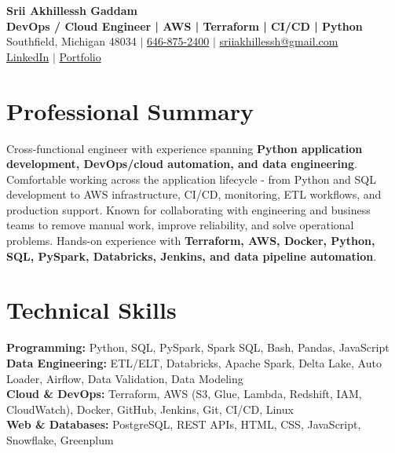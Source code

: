\documentclass[letterpaper,10pt]{article}
\begin{document}
\fontsize{9.35pt}{10.45pt}\selectfont

\begin{center}
    {\LARGE \textbf{Srii Akhillessh Gaddam}} \\[-1pt]
    \textbf{DevOps / Cloud Engineer | AWS | Terraform | CI/CD | Python} \\[2pt]
    Southfield, Michigan 48034 $|$
    \href{tel:6468752400}{646-875-2400} $|$
    \href{mailto:sriiakhillessh@gmail.com}{sriiakhillessh@gmail.com} \\[1pt]
    \href{https://www.linkedin.com/in/srii-akhiilessh-gaddam-b48668191/}{LinkedIn} $|$
    \href{https://sriiakhillesshg.github.io/portfolio/}{Portfolio}
\end{center}
\vspace{-8pt}

\section{Professional Summary}
\small{Cross-functional engineer with experience spanning \textbf{Python application development, DevOps/cloud automation, and data engineering}. Comfortable working across the application lifecycle - from Python and SQL development to AWS infrastructure, CI/CD, monitoring, ETL workflows, and production support. Known for collaborating with engineering and business teams to remove manual work, improve reliability, and solve operational problems. Hands-on experience with \textbf{Terraform, AWS, Docker, Python, SQL, PySpark, Databricks, Jenkins, and data pipeline automation}.}

\section{Technical Skills}
\small{
\textbf{Programming:} Python, SQL, PySpark, Spark SQL, Bash, Pandas, JavaScript \\
\textbf{Data Engineering:} ETL/ELT, Databricks, Apache Spark, Delta Lake, Auto Loader, Airflow, Data Validation, Data Modeling \\
\textbf{Cloud \& DevOps:} Terraform, AWS (S3, Glue, Lambda, Redshift, IAM, CloudWatch), Docker, GitHub, Jenkins, Git, CI/CD, Linux \\
\textbf{Web \& Databases:} PostgreSQL, REST APIs, HTML, CSS, JavaScript, Snowflake, Greenplum
}
\end{document}
